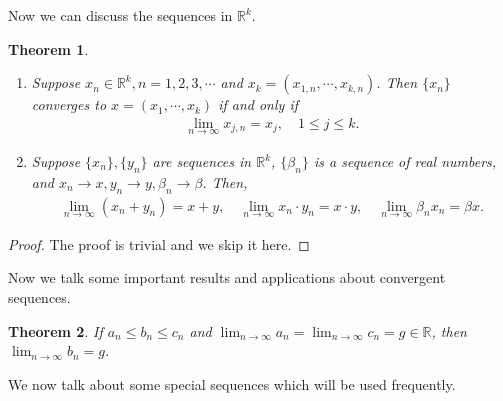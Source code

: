 \documentclass[10pt]{book}
\newtheorem{theorem}{Theorem}[chapter]
\theoremstyle{definition}
\numberwithin{equation}{chapter}
\begin{document}
\medskip

Now we can discuss the sequences in $\mathbb{R}^k$.

\medskip

\begin{theorem}
~\begin{enumerate}[label=(\alph*)]
    \item Suppose $x_n \in \mathbb{R}^k, n = 1,2,3,\cdots$ and $x_k = (x_{1,n}, \cdots, x_{k,n})$. Then $\{x_n\}$ converges to $x = (x_1, \cdots, x_k)$ if and only if 
    \begin{align*}
        \lim_{n\to\infty} x_{j,n} = x_j, \quad 1 \leq j \leq k.
    \end{align*}
    
    \item Suppose $\{x_n\}, \{y_n\}$ are sequences in $\mathbb{R}^k$, $\{\beta_n\}$ is a sequence of real numbers, and $x_n \to x, y_n \to y, \beta_n \to \beta$. Then,
    \begin{align*}
        \lim_{n\to\infty} (x_n + y_n) = x + y, \quad \lim_{n\to\infty} x_n \cdot y_n = x \cdot y, \quad \lim_{n\to\infty} \beta_n x_n = \beta x.
    \end{align*}
\end{enumerate}
\end{theorem}
\begin{proof}
The proof is trivial and we skip it here.
\end{proof}

\medskip

Now we talk some important results and applications about convergent sequences.

\medskip

\begin{theorem}
If $a_n \leq b_n \leq c_n$ and $\lim_{n\to\infty} a_n = \lim_{n\to\infty} c_n = g \in \mathbb{R}$, then $\lim_{n\to\infty} b_n = g$.
\end{theorem}

\medskip

We now talk about some special sequences which will be used frequently.

\medskip
\end{document}
